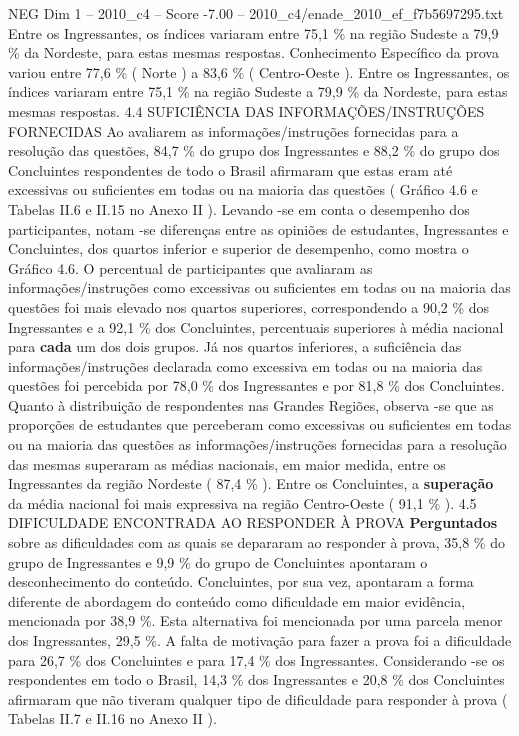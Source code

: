 \begin{textsample}{NEG Dim 1 – 2010\_c4 – Score -7.00 – 2010\_c4/enade\_2010\_ef\_f7b5697295.txt}
Entre os Ingressantes, os índices variaram entre 75,1 \% na região Sudeste a 79,9 \% da Nordeste, para estas mesmas respostas.
Conhecimento Específico da prova variou entre 77,6 \% ( Norte ) a 83,6 \% ( Centro-Oeste ).
Entre os Ingressantes, os índices variaram entre 75,1 \% na região Sudeste a 79,9 \% da Nordeste, para estas mesmas respostas. 4.4 SUFICIÊNCIA DAS INFORMAÇÕES/INSTRUÇÕES FORNECIDAS Ao avaliarem as informações/instruções fornecidas para a resolução das questões, 84,7 \% do grupo dos Ingressantes e 88,2 \% do grupo dos Concluintes respondentes de todo o Brasil afirmaram que estas eram até excessivas ou suficientes em todas ou na maioria das questões ( Gráfico 4.6 e Tabelas II.6 e II.15 no Anexo II ).
Levando -se em conta o desempenho dos participantes, notam -se diferenças entre as opiniões de estudantes, Ingressantes e Concluintes, dos quartos inferior e superior de desempenho, como mostra o Gráfico 4.6.
O percentual de participantes que avaliaram as informações/instruções como excessivas ou suficientes em todas ou na maioria das questões foi mais elevado nos quartos superiores, correspondendo a 90,2 \% dos Ingressantes e a 92,1 \% dos Concluintes, percentuais superiores à média nacional para \textbf{cada} um dos dois grupos.
Já nos quartos inferiores, a suficiência das informações/instruções declarada como excessiva em todas ou na maioria das questões foi percebida por 78,0 \% dos Ingressantes e por 81,8 \% dos Concluintes.
Quanto à distribuição de respondentes nas Grandes Regiões, observa -se que as proporções de estudantes que perceberam como excessivas ou suficientes em todas ou na maioria das questões as informações/instruções fornecidas para a resolução das mesmas superaram as médias nacionais, em maior medida, entre os Ingressantes da região Nordeste ( 87,4 \% ).
Entre os Concluintes, a \textbf{superação} da média nacional foi mais expressiva na região Centro-Oeste ( 91,1 \% ). 4.5 DIFICULDADE ENCONTRADA AO RESPONDER À PROVA \textbf{Perguntados} sobre as dificuldades com as quais se depararam ao responder à prova, 35,8 \% do grupo de Ingressantes e 9,9 \% do grupo de Concluintes apontaram o desconhecimento do conteúdo.
Concluintes, por sua vez, apontaram a forma diferente de abordagem do conteúdo como dificuldade em maior evidência, mencionada por 38,9 \%.
Esta alternativa foi mencionada por uma parcela menor dos Ingressantes, 29,5 \%.
A falta de motivação para fazer a prova foi a dificuldade para 26,7 \% dos Concluintes e para 17,4 \% dos Ingressantes.
Considerando -se os respondentes em todo o Brasil, 14,3 \% dos Ingressantes e 20,8 \% dos Concluintes afirmaram que não tiveram qualquer tipo de dificuldade para responder à prova ( Tabelas II.7 e II.16 no Anexo II ).

\end{textsample}
